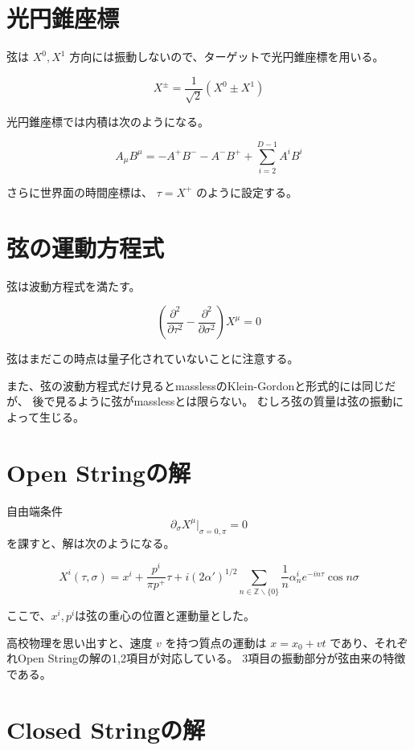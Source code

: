 \documentclass[uplatex]{jsarticle}
\begin{document}
\section{光円錐座標}

弦は
$X^{0}, X^{1}$
方向には振動しないので、ターゲットで光円錐座標を用いる。

$$
	X^{\pm} = \frac{1}{\sqrt{2}} (X^{0} \pm X^{1})
$$

光円錐座標では内積は次のようになる。

$$
	A_{\mu} B^{\mu}
	= - A^{+} B^{-} - A^{-} B^{+} + \sum_{i=2}^{D-1} A^{i} B^{i}
$$

さらに世界面の時間座標は、
$\tau=X^{+}$
のように設定する。

\section{弦の運動方程式}

弦は波動方程式を満たす。

$$
	\left(
	\frac{\partial^{2}}{\partial \tau^{2}}
	-
	\frac{\partial^{2}}{\partial \sigma^{2}}
	\right)
	X^{\mu}
	=0
$$


弦はまだこの時点は量子化されていないことに注意する。

また、弦の波動方程式だけ見るとmasslessのKlein-Gordonと形式的には同じだが、
後で見るように弦がmasslessとは限らない。
むしろ弦の質量は弦の振動によって生じる。

\section{Open Stringの解}

自由端条件
$$
	\partial_{\sigma} X^{\mu} |_{\sigma=0,\pi} = 0
$$
を課すと、解は次のようになる。

$$
	X^{i}(\tau, \sigma)
	=
	x^{i} + \frac{p^{i}}{\pi p^{+}} \tau
	+
	i (2 \alpha')^{1/2} \sum_{n \in \mathbb{Z} \backslash \{ 0 \} }
	\frac{1}{n}
	\alpha^{i}_{n} e^{- i n \tau}
	\cos n \sigma
$$

ここで、$x^{i},p^{i}$は弦の重心の位置と運動量とした。

高校物理を思い出すと、速度
$v$
を持つ質点の運動は
$x = x_{0} + vt$
であり、それぞれOpen Stringの解の1,2項目が対応している。
3項目の振動部分が弦由来の特徴である。

\section{Closed Stringの解}
\end{document}
